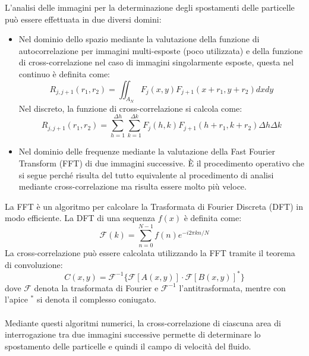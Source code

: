 L'analisi delle immagini per la determinazione degli spostamenti delle particelle può essere effettuata in due diversi domini:
\begin{itemize}
    \item Nel dominio dello spazio mediante la valutazione della funzione di autocorrelazione per immagini multi-esposte (poco utilizzata) e della funzione di cross-correlazione nel caso di immagini singolarmente esposte, questa nel continuo è definita come:
    \begin{equation*}
        R_{j,j+1}(r_1,r_2) = \iint_{A_N} F_j(x,y)F_{j+1}(x+r_1,y+r_2)dxdy
    \end{equation*}
    Nel discreto, la funzione di cross-correlazione si calcola come:
    \begin{equation*}
        R_{j,j+1}(r_1,r_2) = \sum_{h=1}^{\Delta h}\sum_{k=1}^{\Delta k} F_j(h,k) F_{j+1}(h+r_1, k+r_2)\Delta h \Delta k
    \end{equation*}
    \item Nel dominio delle frequenze mediante la valutazione della Fast Fourier Transform (FFT) di due immagini successive. È il procedimento operativo che si segue perché risulta del tutto equivalente al procedimento di analisi mediante cross-correlazione ma risulta essere molto più veloce.
\end{itemize}

\noindent La FFT è un algoritmo per calcolare la Trasformata di Fourier Discreta (DFT) in modo efficiente. La DFT di una sequenza $f(x)$ è definita come:
\begin{equation*}
    \mathcal F(k) = \sum_{n=0}^{N-1} f(n) e^{-i 2 \pi k n / N}
\end{equation*}
La cross-correlazione può essere calcolata utilizzando la FFT tramite il teorema di convoluzione:
\begin{equation*}
C(x, y) = \mathcal{F}^{-1} \{ \mathcal{F}[A(x, y)] \cdot \mathcal{F}[B(x, y)]^* \}
\end{equation*}
dove $\mathcal{F}$ denota la trasformata di Fourier e $\mathcal{F}^{-1}$ l'antitrasformata, mentre con l'apice $^*$ si denota il complesso coniugato.\\\\
Mediante questi algoritmi numerici, la cross-correlazione di ciascuna area di interrogazione tra due immagini successive permette di determinare lo spostamento delle particelle e quindi il campo di velocità del fluido.

